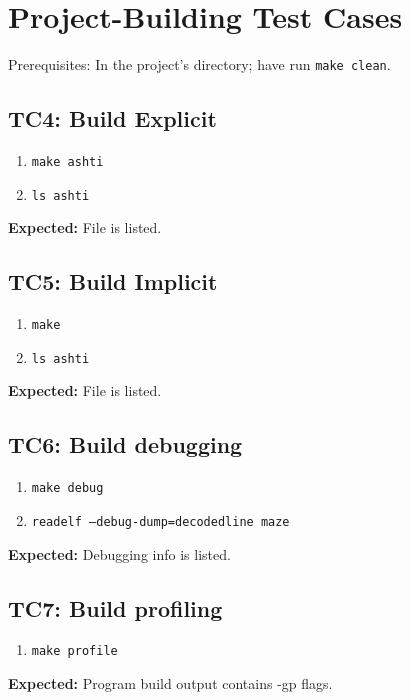 \documentclass[11pt]{report}
\def\dirname{ashti}
\begin{document}
\section*{Project-Building Test Cases}
Prerequisites: In the project's directory; have run {\texttt{\color{MidnightBlue}make clean}}.
\subsection*{TC4: Build Explicit}
\begin{enumerate}
  \item {\texttt{\color{MidnightBlue}make \dirname}}
  \item {\texttt{\color{MidnightBlue}ls \dirname}}
\end{enumerate}
\textbf{Expected:} File is listed.
\subsection*{TC5: Build Implicit}
\begin{enumerate}
  \item {\texttt{\color{MidnightBlue}make}}
  \item {\texttt{\color{MidnightBlue}ls \dirname}}
\end{enumerate}
\textbf{Expected:} File is listed.
\subsection*{TC6: Build debugging}
\begin{enumerate}
  \item {\texttt{\color{MidnightBlue}make debug}}
  \item {\texttt{\color{MidnightBlue}readelf --debug-dump=decodedline maze}}
\end{enumerate}
\textbf{Expected:} Debugging info is listed.
\subsection*{TC7: Build profiling}
\begin{enumerate}
  \item {\texttt{\color{MidnightBlue}make profile}}
\end{enumerate}
\textbf{Expected:} Program build output contains -gp flags.
\end{document}
